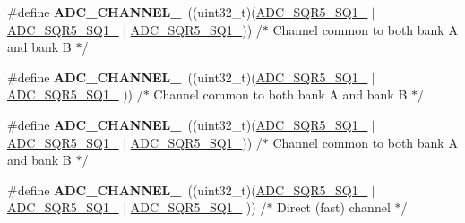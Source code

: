 \begin{DoxyCompactItemize}
\item 
\hypertarget{group___a_d_c__channels_ga3660ec3033d9dade6c0aafd9d0d91989}{\#define {\bfseries A\-D\-C\-\_\-\-C\-H\-A\-N\-N\-E\-L\-\_}~((uint32\-\_\-t)(\hyperlink{group___peripheral___registers___bits___definition_ga72e4578aaae278121803054afacaf141}{A\-D\-C\-\_\-\-S\-Q\-R5\-\_\-\-S\-Q1\-\_}                                   $\vert$ \hyperlink{group___peripheral___registers___bits___definition_ga374490cc8d96ed0a40d3f212bc6fd6d1}{A\-D\-C\-\_\-\-S\-Q\-R5\-\_\-\-S\-Q1\-\_} $\vert$ \hyperlink{group___peripheral___registers___bits___definition_ga6d7b92bf8ba789b76256e205988cc8de}{A\-D\-C\-\_\-\-S\-Q\-R5\-\_\-\-S\-Q1\-\_}))  /$\ast$ Channel common to both bank A and bank B $\ast$/}\label{group___a_d_c__channels_ga3660ec3033d9dade6c0aafd9d0d91989}

\item 
\hypertarget{group___a_d_c__channels_gaf9d23f9650b7131466f60ded91777ce1}{\#define {\bfseries A\-D\-C\-\_\-\-C\-H\-A\-N\-N\-E\-L\-\_}~((uint32\-\_\-t)(\hyperlink{group___peripheral___registers___bits___definition_ga72e4578aaae278121803054afacaf141}{A\-D\-C\-\_\-\-S\-Q\-R5\-\_\-\-S\-Q1\-\_}                  $\vert$ \hyperlink{group___peripheral___registers___bits___definition_ga4e21c2a89e71e60406cacb23de6f6597}{A\-D\-C\-\_\-\-S\-Q\-R5\-\_\-\-S\-Q1\-\_}                                  ))  /$\ast$ Channel common to both bank A and bank B $\ast$/}\label{group___a_d_c__channels_gaf9d23f9650b7131466f60ded91777ce1}

\item 
\hypertarget{group___a_d_c__channels_ga37b978d729d178ff2b9df865a861fec9}{\#define {\bfseries A\-D\-C\-\_\-\-C\-H\-A\-N\-N\-E\-L\-\_}~((uint32\-\_\-t)(\hyperlink{group___peripheral___registers___bits___definition_ga72e4578aaae278121803054afacaf141}{A\-D\-C\-\_\-\-S\-Q\-R5\-\_\-\-S\-Q1\-\_}                  $\vert$ \hyperlink{group___peripheral___registers___bits___definition_ga4e21c2a89e71e60406cacb23de6f6597}{A\-D\-C\-\_\-\-S\-Q\-R5\-\_\-\-S\-Q1\-\_}                  $\vert$ \hyperlink{group___peripheral___registers___bits___definition_ga6d7b92bf8ba789b76256e205988cc8de}{A\-D\-C\-\_\-\-S\-Q\-R5\-\_\-\-S\-Q1\-\_}))  /$\ast$ Channel common to both bank A and bank B $\ast$/}\label{group___a_d_c__channels_ga37b978d729d178ff2b9df865a861fec9}

\item 
\hypertarget{group___a_d_c__channels_ga2387524d2001d51fbf86bec8bac3bb46}{\#define {\bfseries A\-D\-C\-\_\-\-C\-H\-A\-N\-N\-E\-L\-\_}~((uint32\-\_\-t)(\hyperlink{group___peripheral___registers___bits___definition_ga72e4578aaae278121803054afacaf141}{A\-D\-C\-\_\-\-S\-Q\-R5\-\_\-\-S\-Q1\-\_}                  $\vert$ \hyperlink{group___peripheral___registers___bits___definition_ga4e21c2a89e71e60406cacb23de6f6597}{A\-D\-C\-\_\-\-S\-Q\-R5\-\_\-\-S\-Q1\-\_} $\vert$ \hyperlink{group___peripheral___registers___bits___definition_ga374490cc8d96ed0a40d3f212bc6fd6d1}{A\-D\-C\-\_\-\-S\-Q\-R5\-\_\-\-S\-Q1\-\_}                 ))  /$\ast$ Direct (fast) channel $\ast$/}\label{group___a_d_c__channels_ga2387524d2001d51fbf86bec8bac3bb46}


\end{DoxyCompactItemize}
